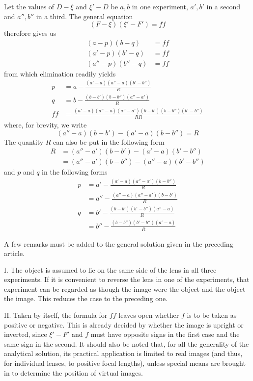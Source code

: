 Let the values of $D-\xi$ and $\xi'-D$ be $a,b$ in one experiment, $a',b'$ in a second and $a'',b''$ in a third. The general equation
\[
(F-\xi)(\xi'-F')=ff
\]
therefore gives us
\[
\begin{aligned}
(a-p)(b-q)&=ff\\
(a'-p)(b'-q)&=ff\\
(a''-p)(b''-q)&=ff
\end{aligned}
\]
from which elimination readily yields
\[
\begin{aligned}
p&=a-\frac{(a'-a)(a''-a)(b'-b'')}{R}\\
q&=b-\frac{(b-b')(b-b'')(a''-a')}{R}\\
ff&=\frac{(a'-a)(a''-a)(a''-a')(b-b')(b-b'')(b'-b'')}{RR}
\end{aligned}
\]
where, for brevity, we write
\[
(a''-a)(b-b')-(a'-a)(b-b'')=R
\]
The quantity $R$ can also be put in the following form
\[
\begin{aligned}
R&=(a''-a')(b-b')-(a'-a)(b'-b'')\\
&=(a''-a')(b-b'')-(a''-a)(b'-b'')
\end{aligned}
\]
and $p$ and $q$ in the following forms
\[
\begin{aligned}
p&=a'-\frac{(a'-a)(a''-a')(b-b'')}{R}\\
&=a''-\frac{(a''-a)(a''-a')(b-b')}{R}\\
q&=b'-\frac{(b-b')(b'-b'')(a''-a)}{R}\\
&=b''-\frac{(b-b'')(b'-b'')(a'-a)}{R}
\end{aligned}
\]

A few remarks must be added to the general solution given in the preceding article.

I. The object is assumed to lie on the same side of the lens in all three experiments. If it is convenient to reverse the lens in one of the experiments, that experiment can be regarded as though the image were the object and the object the image. This reduces the case to the preceding one.

II. Taken by itself, the formula for $ff$ leaves open whether $f$ is to be taken as positive or negative. This is already decided by whether the image is upright or inverted, since $\xi'-F'$ and $f$ must have opposite signs in the first case and the same sign in the second. It should also be noted that, for all the generality of the analytical solution, its practical application is limited to real images (and thus, for individual lenses, to positive focal lengths), unless special means are brought in to determine the position of virtual images.

